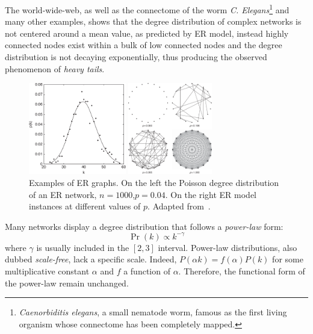 The world-wide-web, as well as the connectome of the worm \emph{C.
Elegans}\footnote{\emph{Caenorbiditis elegans}, a small nematode worm, famous as the first living organism whose connectome has been completely mapped.} and many other examples, shows that the degree distribution of complex networks is not centered around a mean value, as predicted by ER model, instead highly connected nodes exist within a bulk of low connected nodes and the degree distribution is not decaying exponentially, thus producing the observed phenomenon of \emph{heavy tails}.
\begin{figure}
\centering
\begin{minipage}[b]{0.5\textwidth}\centering
\includegraphics[height=4cm]{images/deg_dist_poisson_er.pdf}
\end{minipage}\noindent
\begin{minipage}[b]{0.5\textwidth}\centering
\includegraphics[height=4cm]{images/er_graphs.pdf}
\end{minipage}
\caption{Examples of ER graphs.
On the left the Poisson degree distribution of an ER network, $n=1000$,$p=0.04$.
On the right ER model instances at different values of $p$.
Adapted from~\cite{estrada2011}.}
\label{fig:deg_dist_poisson_er}
\end{figure}
Many networks display a degree distribution that follows a \emph{power-law} form:
\begin{equation}
\Pr(k) \propto k^{-\gamma}
\end{equation}
where $\gamma$ is usually included in the $[2,3]$ interval.
Power-law distributions, also dubbed \emph{scale-free}, lack a specific scale.
Indeed, $P(\alpha k)=f(\alpha)P(k)$ for some multiplicative constant $\alpha$  and $f$ a function of $\alpha$.
Therefore, the functional form of the power-law remain unchanged.

